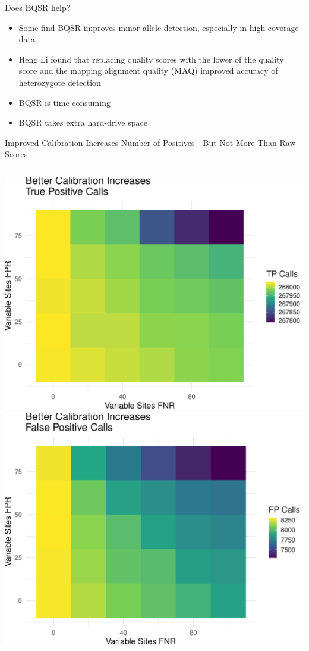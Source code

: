 \documentclass[table]{beamer}
\begin{document}
\begin{frame}{Does BQSR help?}
\begin{itemize}
\item Some find BQSR improves minor allele detection, especially in high coverage data
\item Heng Li found that replacing quality scores with the lower of the quality score and the mapping alignment quality (MAQ) improved accuracy of heterozygote detection
\item BQSR is time-consuming
\item BQSR takes extra hard-drive space
\end{itemize}
\end{frame}

\begin{frame}{Improved Calibration Increases Number of Positives - But Not More Than Raw Scores}
\begin{columns}
\includegraphics[width=.9\linewidth]{tp_heatmap.pdf}
\includegraphics[width=.9\linewidth]{fp_heatmap.pdf}
\end{columns}
\end{frame}
\end{document}
